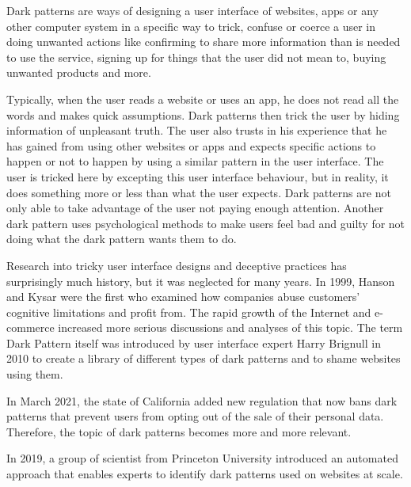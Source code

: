 Dark patterns\cite{dark-patterns-brignull}\cite{dark-patterns-colin}\cite{the-year-dark-pattern-won}\cite{dark-patterns-at-scale} are ways of designing a user interface of websites, apps or any other computer system in a specific way to trick, confuse or coerce a user in doing unwanted actions like confirming to share more information than is needed to use the service, signing up for things that the user did not mean to, buying unwanted products and more. 

Typically, when the user reads a website or uses an app, he does not read all the words and makes quick assumptions\cite{dark-patterns-brignull}. Dark patterns then trick the user by hiding information of unpleasant truth. The user also trusts in his experience that he has gained from using other websites or apps and expects specific actions to happen or not to happen by using a similar pattern in the user interface. The user is tricked here by excepting this user interface behaviour, but in reality, it does something more or less than what the user expects\cite{the-year-dark-pattern-won}. Dark patterns are not only able to take advantage of the user not paying enough attention. Another dark pattern uses psychological methods to make users feel bad and guilty for not doing what the dark pattern wants them to do\cite{the-year-dark-pattern-won}.

Research into tricky user interface designs and deceptive practices has surprisingly much history, but it was neglected for many years. In 1999, Hanson and Kysar were the first who examined how companies abuse customers' cognitive limitations and profit from. The rapid growth of the Internet and e-commerce increased more serious discussions and analyses of this topic. The term Dark Pattern itself was introduced by user interface expert Harry Brignull in 2010 to create a library of different types of dark patterns and to shame websites using them\cite{dark-patterns-brignull-about-us}. 


In March 2021, the state of California added new regulation that now bans dark patterns that prevent users from opting out of the sale of their personal data\cite{california-bans-dark-patterns}. Therefore, the topic of dark patterns becomes more and more relevant.


In 2019, a group of scientist from Princeton University introduced an automated approach that enables experts to identify dark patterns used on websites at scale\cite{dark-patterns-at-scale}. 

